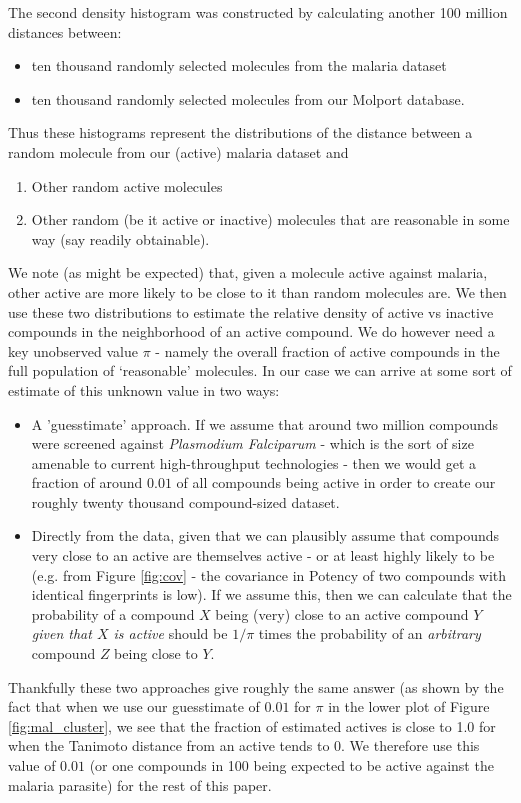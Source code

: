 \documentclass{article}
\begin{document}
The second density histogram was constructed by calculating another 100 million distances between:
\begin{itemize}
    \item ten thousand randomly selected molecules from the malaria dataset
    \item ten thousand randomly selected molecules from our Molport database.
\end{itemize}
Thus these histograms represent the distributions of the distance between a random molecule from our (active) malaria dataset and 
\begin{enumerate}
    \item Other random active molecules
    \item Other random (be it active or inactive) molecules that are reasonable in some way (say readily obtainable).
\end{enumerate}
We note (as might be expected) that, given a molecule active against malaria, other active are more likely to be close to it than random molecules are.
\newline
\newline
We then use these two distributions to estimate the relative density of active vs inactive compounds in the neighborhood of an active compound.
We do however need a key unobserved value $\pi$ - namely the overall fraction of active compounds in the full population of `reasonable' molecules.  In our case we can arrive at some sort of estimate of this unknown value in two ways:
\begin{itemize}
    \item A 'guesstimate' approach. If we assume that around two million compounds were screened against \textit{Plasmodium Falciparum} - which is the sort of size amenable to current high-throughput technologies\cite{PaweSzymanskiMagdalenaMarkowicz2012} - then we would get a fraction of around $0.01$ of all compounds being active in order to create our roughly twenty thousand compound-sized dataset.
    \item Directly from the data, given that we can plausibly assume that compounds very close to an active are themselves active - or at least highly likely to be (e.g. from Figure \ref{fig:cov} - the covariance in Potency of two compounds with identical fingerprints is low).  If we assume this, then we can calculate that the probability of a compound $X$ being (very) close to an active compound $Y$ \textit{given that $X$ is active} should be $1/\pi$ times the probability of an \textit{arbitrary} compound $Z$ being close to $Y$.
\end{itemize}
Thankfully these two approaches give roughly the same answer (as shown by the fact that when we use our guesstimate of $0.01$ for $\pi$ in the lower plot of Figure \ref{fig:mal_cluster}, we see that the fraction of estimated actives is close to 1.0 for when the Tanimoto distance from an active tends to 0.  We therefore use this value of $0.01$ (or one compounds in 100 being expected to be active against the malaria parasite) for the rest of this paper.
\end{document}
